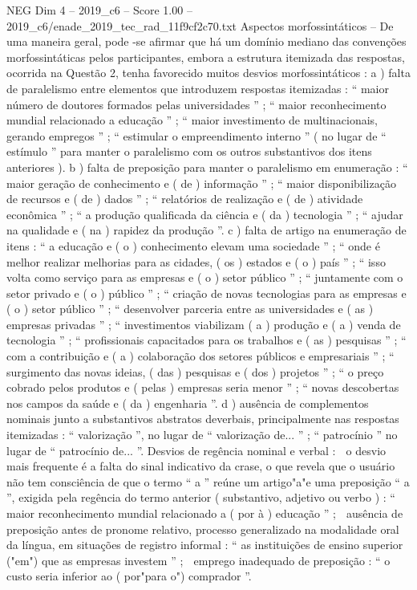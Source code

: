 \begin{textsample}{NEG Dim 4 – 2019\_c6 – Score 1.00 – 2019\_c6/enade\_2019\_tec\_rad\_11f9cf2c70.txt}
Aspectos morfossintáticos – De uma maneira geral, pode -se afirmar que há um domínio mediano das convenções morfossintáticas pelos participantes, embora a estrutura itemizada das respostas, ocorrida na Questão 2, tenha favorecido muitos desvios morfossintáticos : a ) falta de paralelismo entre elementos que introduzem respostas itemizadas : “ maior número de doutores formados pelas universidades ” ; “ maior reconhecimento mundial relacionado a educação ” ; “ maior investimento de multinacionais, gerando empregos ” ; “ estimular o empreendimento interno ” ( no lugar de “ estímulo ” para manter o paralelismo com os outros substantivos dos itens anteriores ). b ) falta de preposição para manter o paralelismo em enumeração : “ maior geração de conhecimento e ( de ) informação ” ; “ maior disponibilização de recursos e ( de ) dados ” ; “ relatórios de realização e ( de ) atividade econômica ” ; “ a produção qualificada da ciência e ( da ) tecnologia ” ; “ ajudar na qualidade e ( na ) rapidez da produção ”. c ) falta de artigo na enumeração de itens : “ a educação e ( o ) conhecimento elevam uma sociedade ” ; “ onde é melhor realizar melhorias para as cidades, ( os ) estados e ( o ) país ” ; “ isso volta como serviço para as empresas e ( o ) setor público ” ; “ juntamente com o setor privado e ( o ) público ” ; “ criação de novas tecnologias para as empresas e ( o ) setor público ” ; “ desenvolver parceria entre as universidades e ( as ) empresas privadas ” ; “ investimentos viabilizam ( a ) produção e ( a ) venda de tecnologia ” ; “ profissionais capacitados para os trabalhos e ( as ) pesquisas ” ; “ com a contribuição e ( a ) colaboração dos setores públicos e empresariais ” ; “ surgimento das novas ideias, ( das ) pesquisas e ( dos ) projetos ” ; “ o preço cobrado pelos produtos e ( pelas ) empresas seria menor ” ; “ novas descobertas nos campos da saúde e ( da ) engenharia ”. d ) ausência de complementos nominais junto a substantivos abstratos deverbais, principalmente nas respostas itemizadas : “ valorização ”, no lugar de “ valorização de... ” ; “ patrocínio ” no lugar de “ patrocínio de... ”.
Desvios de regência nominal e verbal :  o desvio mais frequente é a falta do sinal indicativo da crase, o que revela que o usuário não tem consciência de que o termo “ a ” reúne um artigo"a"e uma preposição “ a ”, exigida pela regência do termo anterior ( substantivo, adjetivo ou verbo ) : “ maior reconhecimento mundial relacionado a ( por à ) educação ” ;  ausência de preposição antes de pronome relativo, processo generalizado na modalidade oral da língua, em situações de registro informal : “ as instituições de ensino superior ("em") que as empresas investem ” ;  emprego inadequado de preposição : “ o custo seria inferior ao ( por"para o") comprador ”.

\end{textsample}
